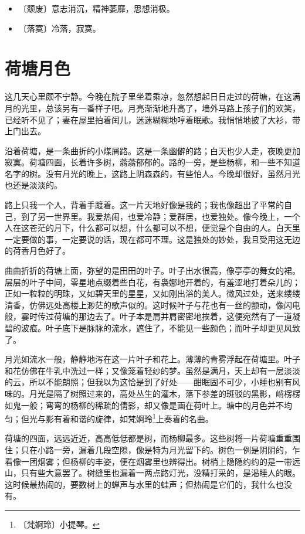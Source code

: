 \documentclass[12pt,UTF-8,openany]{ctexbook}
\begin{document}
\begin{itemize}
    \setlength\itemsep{-0.2em}
    \item 〔颓废〕意志消沉，精神萎靡，思想消极。
    \item 〔落寞〕冷落，寂寞。
\end{itemize}

\chapter{荷塘月色}

\begin{normalsize}
    
    这几天心里颇不宁静。今晚在院子里坐着乘凉，忽然想起日日走过的荷塘，在这满月的光里，总该另有一番样子吧。月亮渐渐地升高了，墙外马路上孩子们的欢笑，已经听不见了；妻在屋里拍着闰儿，迷迷糊糊地哼着眠歌。我悄悄地披了大衫，带上门出去。
    
    沿着荷塘，是一条曲折的小煤屑路。这是一条幽僻的路；白天也少人走，夜晚更加寂寞。荷塘四面，长着许多树，蓊蓊郁郁的。路的一旁，是些杨柳，和一些不知道名字的树。没有月光的晚上，这路上阴森森的，有些怕人。今晚却很好，虽然月光也还是淡淡的。
    
    路上只我一个人，背着手踱着。这一片天地好像是我的；我也像超出了平常的自己，到了另一世界里。我爱热闹，也爱冷静；爱群居，也爱独处。像今晚上，一个人在这苍茫的月下，什么都可以想，什么都可以不想，便觉是个自由的人。白天里一定要做的事，一定要说的话，现在都可不理。这是独处的妙处，我且受用这无边的荷香月色好了。
    
    曲曲折折的荷塘上面，弥望的是田田的叶子。叶子出水很高，像亭亭的舞女的裙。层层的叶子中间，零星地点缀着些白花，有袅娜地开着的，有羞涩地打着朵儿的；正如一粒粒的明珠，又如碧天里的星星，又如刚出浴的美人。微风过处，送来缕缕清香，仿佛远处高楼上渺茫的歌声似的。这时候叶子与花也有一丝的颤动，像闪电般，霎时传过荷塘的那边去了。叶子本是肩并肩密密地挨着，这便宛然有了一道凝碧的波痕。叶子底下是脉脉的流水，遮住了，不能见一些颜色；而叶子却更见风致了。
    
    月光如流水一般，静静地泻在这一片叶子和花上。薄薄的青雾浮起在荷塘里。叶子和花仿佛在牛乳中洗过一样；又像笼着轻纱的梦。虽然是满月，天上却有一层淡淡的云，所以不能朗照；但我以为这恰是到了好处——酣眠固不可少，小睡也别有风味的。月光是隔了树照过来的，高处丛生的灌木，落下参差的斑驳的黑影，峭楞楞如鬼一般；弯弯的杨柳的稀疏的倩影，却又像是画在荷叶上。塘中的月色并不均匀；但光与影有着和谐的旋律，如梵婀玲\footnote{〔梵婀玲〕小提琴。}上奏着的名曲。
    
    荷塘的四面，远远近近，高高低低都是树，而杨柳最多。这些树将一片荷塘重重围住；只在小路一旁，漏着几段空隙，像是特为月光留下的。树色一例是阴阴的，乍看像一团烟雾；但杨柳的丰姿，便在烟雾里也辨得出。树梢上隐隐约约的是一带远山，只有些大意罢了。树缝里也漏着一两点路灯光，没精打采的，是渴睡人的眼。这时候最热闹的，要数树上的蝉声与水里的蛙声；但热闹是它们的，我什么也没有。
    

\end{normalsize}
\end{document}
